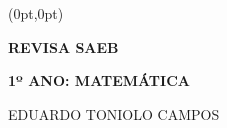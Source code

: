 



\setmainfont{Free Sans}  %

\begingroup\thispagestyle{empty}

\begin{textblock*}{2.625in}(0pt,0pt)%
\vspace*{-3.5cm}
\end{textblock*}
                
              \vspace*{\fill}
              \begin{center}
              {\HUGE\textbf{REVISA SAEB}}\bigskip

              {\LARGE\textbf{1º ANO: MATEMÁTICA}}

              \bigskip
              \bigskip
              \bigskip

              {\Large
                            EDUARDO TONIOLO CAMPOS

                            }
              \end{center}
              \vspace*{\fill}

\endgroup
\pagebreak